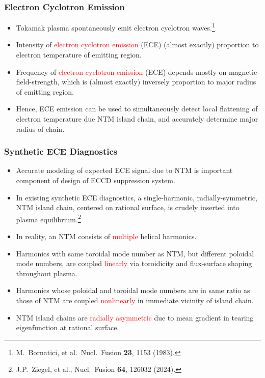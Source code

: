 \documentclass{beamer}
\begin{document}
\begin{frame}
\frametitle{Electron Cyclotron Emission}
 
\begin{itemize}
\item Tokamak plasma spontaneously emit electron cyclotron waves.\footnote{ M.~Bornatici, et al.\ Nucl.\ Fusion {\bf 23}, 1153 (1983).}

\item Intensity of  \textcolor{red}{electron cyclotron emission} (ECE) (almost exactly) proportion to electron temperature of emitting region.

\item Frequency of \textcolor{red}{electron cyclotron emission} (ECE) depends mostly on magnetic field-strength, which is (almost exactly) inversely
proportion to major radius of emitting region. 

\item Hence, ECE emission can be used to simultaneously  detect local flattening of electron temperature due NTM island chain, and 
accurately determine major radius of  chain. 
\end{itemize}
\end{frame}

\begin{frame}
\frametitle{Synthetic ECE Diagnostics}
\begin{itemize}
\item  Accurate modeling of expected ECE signal due to NTM is important component of design of ECCD suppression  system. 
\item In existing synthetic ECE diagnostics,  a single-harmonic, radially-symmetric, NTM island chain, centered on 
rational surface, is
crudely inserted into plasma equilibrium.\footnote{J.P.~Ziegel, et al., Nucl.\ Fusion {\bf 64}, 126032 (2024).} 
\item In reality, an NTM consists of \textcolor{red}{multiple} helical harmonics. 
\item Harmonics with  same toroidal mode number as  NTM, but different poloidal mode numbers, are
coupled \textcolor{red}{linearly} via toroidicity and flux-surface shaping throughout  plasma. 
\item Harmonics whose poloidal and toroidal mode numbers are in  same ratio as those of  NTM are coupled \textcolor{red}{nonlinearly} in  immediate vicinity of island chain. 
\item NTM island chains are \textcolor{red}{radially asymmetric} due to mean gradient in tearing eigenfunction at rational surface. 
\end{itemize}
\end{frame}
\end{document}
